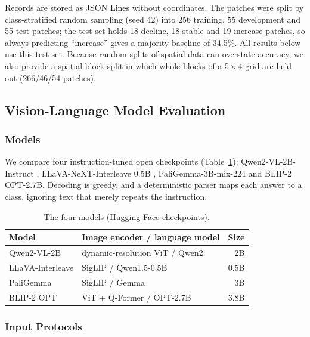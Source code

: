 \documentclass[11pt]{article}
\begin{document}
Records are stored as JSON Lines without coordinates. The patches were
split by class-stratified random sampling (seed 42) into 256 training,
55 development and 55 test patches; the test set holds 18 decline, 18
stable and 19 increase patches, so always predicting ``increase'' gives
a majority baseline of 34.5\%. All results below use this test set. Because
random splits of spatial data can overstate accuracy, we also provide a spatial block split in
which whole blocks of a 5\,$\times$\,4 grid are held out (266/46/54
patches).

\subsection{Vision-Language Model Evaluation}

\subsubsection{Models}

We compare four instruction-tuned open checkpoints (Table~\ref{tab:models}):
Qwen2-VL-2B-Instruct \citep{wang2024qwen2vl}, LLaVA-NeXT-Interleave
0.5B \citep{li2024interleave}, PaliGemma-3B-mix-224
and BLIP-2 OPT-2.7B. Decoding is greedy,
and a deterministic parser maps each answer to a class, ignoring text
that merely repeats the instruction.

\begin{table}[t]
\centering
\small
\begin{tabularx}{\columnwidth}{lXr}
\toprule
Model & Image encoder / language model & Size \\
\midrule
Qwen2-VL-2B & dynamic-resolution ViT / Qwen2 & 2B \\
LLaVA-Interleave & SigLIP / Qwen1.5-0.5B & 0.5B \\
PaliGemma & SigLIP / Gemma & 3B \\
BLIP-2 OPT & ViT + Q-Former / OPT-2.7B & 3.8B \\
\bottomrule
\end{tabularx}
\caption{The four models (Hugging Face checkpoints).}
\label{tab:models}
\end{table}

\subsubsection{Input Protocols}
\label{sec:protocol}
\end{document}
